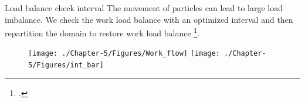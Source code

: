 \documentclass{beamer}
\begin{document}
%
%
%
%
%
%

\begin{frame}{Load balance check interval}
The movement of particles can lead to large load imbalance. We check the work load balance with an optimized interval and then repartition the domain to restore work load balance \footcite{cao2017data}.
\begin{figure}
\flushleft
\texttt{[image: ./Chapter-5/Figures/Work\_flow]}
\hfill
\texttt{[image: ./Chapter-5/Figures/int\_bar]}
\end{figure}
\end{frame}
\end{document}
